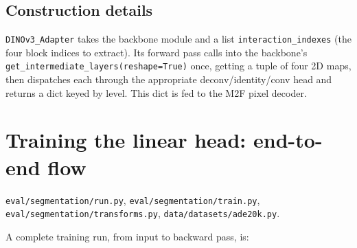 \documentclass[11pt,a4paper]{article}
\begin{document}
\subsection{Construction details}

\texttt{DINOv3\_Adapter} takes the backbone module and a list
\texttt{interaction\_indexes} (the four block indices to extract). Its
forward pass calls into the backbone's
\texttt{get\_intermediate\_layers(reshape=True)} once, getting a tuple of
four 2D maps, then dispatches each through the appropriate
deconv/identity/conv head and returns a dict keyed by level. This dict is
fed to the M2F pixel decoder.

\section{Training the linear head: end-to-end flow}

\begin{srcbox}
\texttt{eval/segmentation/run.py},
\texttt{eval/segmentation/train.py},
\texttt{eval/segmentation/transforms.py},
\texttt{data/datasets/ade20k.py}.
\end{srcbox}

A complete training run, from input to backward pass, is:
\end{document}
